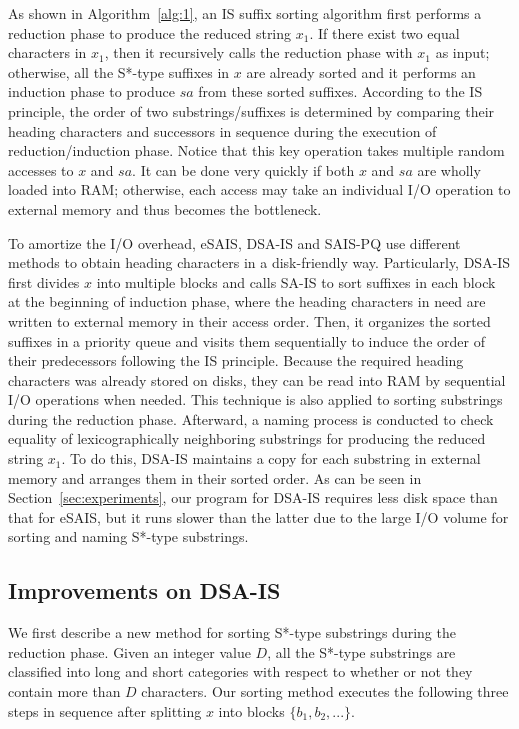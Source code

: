 \documentclass[10pt,journal,compsoc]{IEEEtran}
\begin{document}
As shown in Algorithm~\ref{alg:1}, an IS suffix sorting algorithm first performs a reduction phase to produce the reduced string $x_1$. If there exist two equal characters in $x_1$, then it recursively calls the reduction phase with $x_1$ as input; otherwise, all the S*-type suffixes in $x$ are already sorted and it performs an induction phase to produce $sa$ from these sorted suffixes. According to the IS principle, the order of two substrings/suffixes is determined by comparing their heading characters and successors in sequence during the execution of reduction/induction phase. Notice that this key operation takes multiple random accesses to $x$ and $sa$. It can be done very quickly if both $x$ and $sa$ are wholly loaded into RAM; otherwise, each access may take an individual I/O operation to external memory and thus becomes the bottleneck. 

To amortize the I/O overhead, eSAIS, DSA-IS and SAIS-PQ use different methods to obtain heading characters in a disk-friendly way. Particularly, DSA-IS first divides $x$ into multiple blocks and calls SA-IS to sort suffixes in each block at the beginning of induction phase, where the heading characters in need are written to external memory in their access order. Then, it organizes the sorted suffixes in a priority queue and visits them sequentially to induce the order of their predecessors following the IS principle. Because the required heading characters was already stored on disks, they can be read into RAM by sequential I/O operations when needed. This technique is also applied to sorting substrings during the reduction phase. Afterward, a naming process is conducted to check equality of lexicographically neighboring substrings for producing the reduced string $x_1$. To do this, DSA-IS maintains a copy for each substring in external memory and arranges them in their sorted order. As can be seen in Section~\ref{sec:experiments}, our program for DSA-IS requires less disk space than that for eSAIS, but it runs slower than the latter due to the large I/O volume for sorting and naming S*-type substrings. 


\subsection{Improvements on DSA-IS}

We first describe a new method for sorting S*-type substrings during the reduction phase. Given an integer value $D$, all the S*-type substrings are classified into long and short categories with respect to whether or not they contain more than $D$ characters. Our sorting method executes the following three steps in sequence after splitting $x$ into blocks $\{b_1, b_2, ...\}$. 
\end{document}
